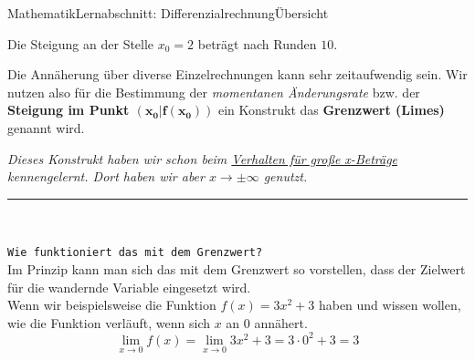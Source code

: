 \documentclass[11pt,twocolumn,oneside,openany,headings=optiontotoc,11pt,numbers=noenddot,final]{article}
\begin{document}
\begin{worksheet}{Mathematik}{Lernabschnitt: Differenzialrechnung}{Übersicht}
		\renewcommand{\arraystretch}{1}\\
		\par\noindent
		Die Steigung an der Stelle \(x_0=2\) beträgt nach Runden \(10\).
		\par\noindent
		\par\noindent
		Die Annäherung über diverse Einzelrechnungen kann sehr zeitaufwendig sein. Wir nutzen also für die Bestimmung der \textit{momentanen Änderungsrate}  bzw. der \textbf{Steigung im Punkt \(\mathbf{(x_0|f(x_0))}\)} ein Konstrukt das \textbf{Grenzwert (Limes)} genannt wird.
		\par\noindent
		\setlength{\leftskip}{0.5cm}
		\textit{Dieses Konstrukt haben wir schon beim \underline{Verhalten für große x-Beträge} kennengelernt. Dort haben wir aber \(x \rightarrow \pm\infty\) genutzt.}
		\par\noindent
		\setlength{\leftskip}{0cm}
		\rule{0.48\textwidth}{0.1pt}\\
		\par\noindent
		\texttt{Wie funktioniert das mit dem Grenzwert?}\\
		Im Prinzip kann man sich das mit dem Grenzwert so vorstellen, dass der \grq{}Zielwert\grq{} für die \grq{}wandernde\grq{} Variable eingesetzt wird.\\
		Wenn wir beispielsweise die Funktion \(f(x) = 3x^2 + 3\) haben und wissen wollen, wie die Funktion verläuft, wenn sich \(x\) an \(0\) annähert.
		\[\lim\limits_{x\rightarrow{}0} f(x) = \lim\limits_{x\rightarrow{}0} 3x^2 + 3 = 3\cdot{}0^2 + 3 = 3 \]
		\\

\end{worksheet}
\end{document}
